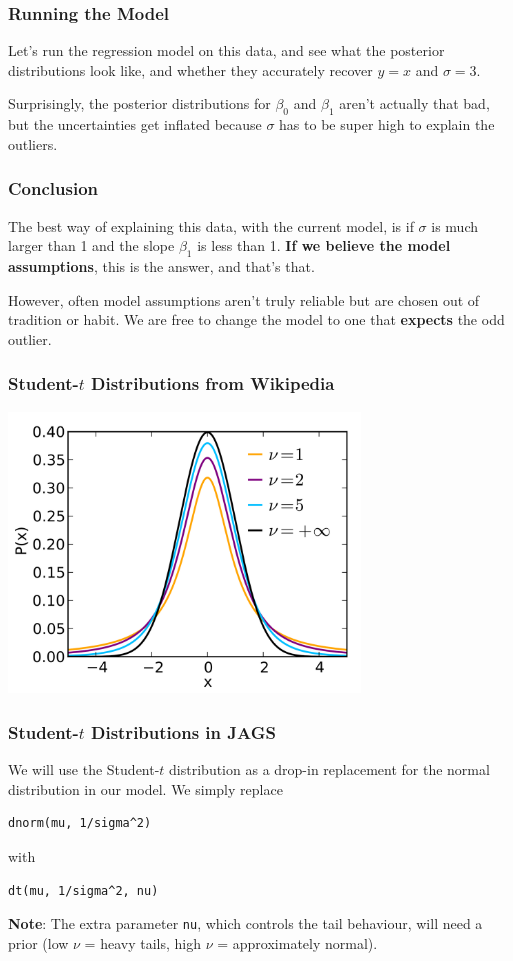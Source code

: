 \documentclass{beamer}
\begin{document}
\begin{frame}
\frametitle{Running the Model}
Let's run the regression model on this data, and see what the posterior
distributions look like, and whether they accurately recover
$y=x$ and $\sigma=3$.\pause

Surprisingly, the posterior distributions for $\beta_0$ and $\beta_1$ aren't
actually that bad, but the uncertainties get inflated because $\sigma$ has
to be super high to explain the outliers.
\end{frame}


\begin{frame}
\frametitle{Conclusion}
The best way of explaining this data, with the current model, is if $\sigma$
is much larger than 1 and the slope $\beta_1$ is less than 1.
{\bf If we believe the model assumptions}, this is the
answer, and that's that.\pause

However, often model assumptions aren't truly reliable but are chosen out of
tradition or habit. We are free to change the model to one that
{\bf expects} the odd outlier.
\end{frame}


\begin{frame}
\frametitle{Student-$t$ Distributions from Wikipedia}

\begin{center}
\includegraphics[width=0.7\textwidth]{images/t_distribution.png}
\end{center}
\end{frame}

\begin{frame}[fragile]
\frametitle{Student-$t$ Distributions in JAGS}
We will use the Student-$t$ distribution as a drop-in replacement for the
normal distribution in our model. We simply replace
\begin{verbatim}
dnorm(mu, 1/sigma^2)
\end{verbatim}
with
\begin{verbatim}
dt(mu, 1/sigma^2, nu)
\end{verbatim}
\pause
{\bf Note}: The extra parameter \texttt{nu}, which controls the
tail behaviour, will need a prior (low $\nu$ = heavy tails,
high $\nu$ = approximately normal).
\end{frame}
\end{document}
